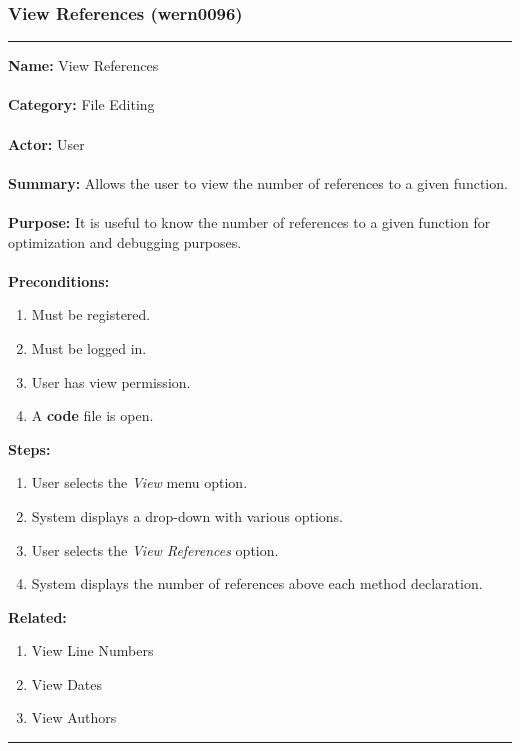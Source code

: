 \documentclass[11pt]{report}
\begin{document}
\subsubsection{View References (wern0096)}
\vspace{2pt}
\hrule
\vspace{8pt}
	\noindent\textbf{Name:} View References \\ \\
	\textbf{Category:} File Editing \\ \\
	\textbf{Actor:} User \\ \\
	\textbf{Summary:} Allows the user to view the number of references to a given function. \\ \\
	\textbf{Purpose:} It is useful to know the number of references to a given function for optimization and debugging purposes. \\ \\
	\textbf{Preconditions:} 
	\begin{enumerate}
		\item Must be registered.
		\item Must be logged in.
		\item User has view permission.
		\item A \textbf{code} file is open.
	\end{enumerate}
	\textbf{Steps:}
	\begin{enumerate}
		\item User selects the \textit{View} menu option.
		\item System displays a drop-down with various options.
		\item User selects the \textit{View References} option.
		\item System displays the number of references above each method declaration.
	\end{enumerate}
	\textbf{Related:}
	\begin{enumerate}
		\item View Line Numbers
		\item View Dates
		\item View Authors
	\end{enumerate}
\vspace{8pt}
\hrule
\newpage
\end{document}
